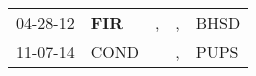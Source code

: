 \begin{supertabular}{p{0.07\textwidth}p{0.06\textwidth}p{0.02\textwidth}p{0.02\textwidth}p{0.06\textwidth}}
 04-28-12\textsuperscript{} &  \textbf{FIR\textsuperscript{}} &  , &  , &  BHSD\textsuperscript{} \\
 11-07-14\textsuperscript{} &          COND\textsuperscript{} &    &  , &  PUPS\textsuperscript{} \\
\end{supertabular}
